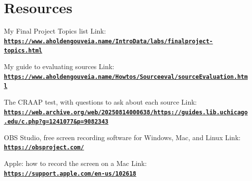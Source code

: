 \documentclass[12pt]{article}
\begin{document}
\section*{Resources}
My Final Project Topics list
Link: \href{https://www.aholdengouveia.name/IntroData/labs/finalproject-topics.html}{\textbf{\nolinkurl{https://www.aholdengouveia.name/IntroData/labs/finalproject-topics.html}}}

My guide to evaluating sources
Link: \href{https://www.aholdengouveia.name/Howtos/Sourceeval/sourceEvaluation.html}{\textbf{\nolinkurl{https://www.aholdengouveia.name/Howtos/Sourceeval/sourceEvaluation.html}}}

The CRAAP test, with questions to ask about each source
Link: \href{https://web.archive.org/web/20250814000638/https://guides.lib.uchicago.edu/c.php?g=1241077&p=9082343}{\textbf{\nolinkurl{https://web.archive.org/web/20250814000638/https://guides.lib.uchicago.edu/c.php?g=1241077&p=9082343}}}

OBS Studio, free screen recording software for Windows, Mac, and Linux
Link: \href{https://obsproject.com/}{\textbf{\nolinkurl{https://obsproject.com/}}}

Apple: how to record the screen on a Mac
Link: \href{https://support.apple.com/en-us/102618}{\textbf{\nolinkurl{https://support.apple.com/en-us/102618}}}
\end{document}

